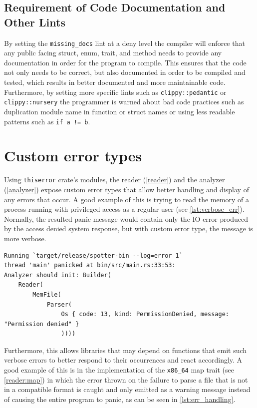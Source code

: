     \subsection{Requirement of Code Documentation and Other Lints}

    By setting the \verb|missing_docs| lint at a deny level the compiler will enforce that any public facing struct, enum, trait, and method needs to provide any documentation in order for the program to compile. This ensures that the code not only needs to be correct, but also documented in order to be compiled and tested, which results in better documented and more maintainable code.
    Furthermore, by setting more specific lints such as \verb|clippy::pedantic| or \verb|clippy::nursery| the programmer is warned about bad code practices such as duplication module name in function or struct names or using less readable patterns such as \verb|if a != b|.

\section{Custom error types}

Using \verb|thiserror| crate's \cite{tolnay_dtolnaythiserror_2024} modules, the reader (\autoref{reader}) and the analyzer (\autoref{analyzer}) expose custom error types that allow better handling and display of any errors that occur.
A good example of this is trying to read the memory of a process running with privileged access as a regular user (see \autoref{lst:verbose_err}). Normally, the resulted panic message would contain only the IO error produced by the access denied system response, but with custom error type, the message is more verbose.

\begin{lstlisting}[caption=\label{lst:verbose_err}{Error when trying to read the pid 1 process}]
Running `target/release/spotter-bin --log=error 1`
thread 'main' panicked at bin/src/main.rs:33:53:
Analyzer should init: Builder(
    Reader(
        MemFile(
            Parser(
                Os { code: 13, kind: PermissionDenied, message: "Permission denied" }
                ))))
\end{lstlisting}

Furthermore, this allows libraries that may depend on functions that emit such verbose errors to better respond to their occurrences and react accordingly.
A good example of this is in the implementation of the \verb|x86_64| map trait (see \autoref{reader:map}) in which the error thrown on the failure to parse a file that is not in a compatible format is caught and only emitted as a warning message instead of causing the entire program to panic, as can be seen in \autoref{lst:err_handling}.

